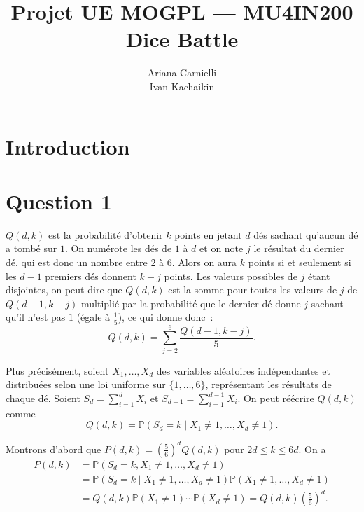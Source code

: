 \documentclass[a4paper,11pt]{amsart}
\theoremstyle{plain}
\begin{document}

\pagestyle{plain}

\title{Projet UE MOGPL --- MU4IN200 \\ Dice Battle}
\author{Ariana Carnielli \\ Ivan Kachaikin}
\date{}

\maketitle



\section{Introduction}

\section{Question 1}

$Q(d,k)$ est la probabilité d'obtenir $k$ points en jetant $d$ dés sachant qu'aucun dé a tombé sur $1$. On numérote les dés de $1$ à $d$ et on note $j$ le résultat du dernier dé, qui est donc un nombre entre $2$ à $6$. Alors on aura $k$ points si et seulement si les $d-1$ premiers dés donnent $k-j$ points. Les valeurs possibles de $j$ étant disjointes, on peut dire que $Q(d, k)$ est la somme pour toutes les valeurs de $j$ de $Q(d-1, k-j)$ multiplié par la probabilité que le dernier dé donne $j$ sachant qu'il n'est pas $1$ (égale à $\frac{1}{5}$), ce qui donne donc~:
\begin{equation}
\label{RecurrenceQ}
Q(d, k) = \sum_{j=2}^6 \frac{Q(d-1, k-j)}{5}.
\end{equation}

Plus précisément, soient $X_1, \dotsc, X_d$ des variables aléatoires indépendantes et distribuées selon une loi uniforme sur $\{1, \dotsc, 6\}$, représentant les résultats de chaque dé. Soient $S_d = \sum_{i=1}^d X_i$ et $S_{d-1} = \sum_{i=1}^{d-1} X_i$. On peut réécrire $Q(d, k)$ comme
\[
Q(d, k) = \mathbb P(S_d = k \mid X_1 \neq 1, \dotsc, X_d \neq 1).
\]

Montrons d'abord que $P(d, k) = \left(\frac{5}{6}\right)^d Q(d, k)$ pour $2d \leq k \leq 6d$. On a
\begin{align*}
P(d, k) & = \mathbb P(S_d = k, X_1 \neq 1, \dotsc, X_d \neq 1) \\
& = \mathbb P(S_d = k \mid X_1 \neq 1, \dotsc, X_d \neq 1) \mathbb P(X_1 \neq 1, \dotsc, X_d \neq 1) \\
& = Q(d, k) \mathbb P(X_1 \neq 1) \dotsm \mathbb P(X_d \neq 1) = Q(d, k) \left(\tfrac{5}{6}\right)^d.
\end{align*}
\end{document}

